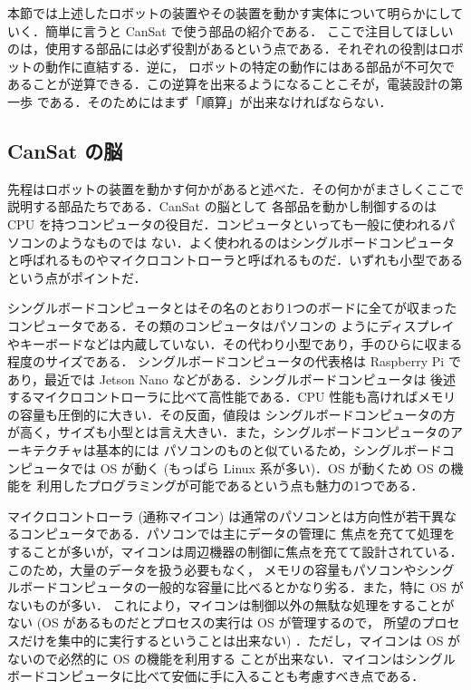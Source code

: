 \documentclass[dvipdfmx]{jsbook}
\begin{document}
  本節では上述したロボットの装置やその装置を動かす実体について明らかにしていく．簡単に言うと CanSat で使う部品の紹介である．
  ここで注目してほしいのは，使用する部品には必ず役割があるという点である．それぞれの役割はロボットの動作に直結する．逆に，
  ロボットの特定の動作にはある部品が不可欠であることが逆算できる．この逆算を出来るようになることこそが，電装設計の第一歩
  である．そのためにはまず「順算」が出来なければならない．

\subsection{CanSat の脳}
\label{subsub:CanSat の脳}

  先程はロボットの装置を動かす何かがあると述べた．その何かがまさしくここで説明する部品たちである．CanSat の脳として
  各部品を動かし制御するのは CPU を持つコンピュータの役目だ．コンピュータといっても一般に使われるパソコンのようなものでは
  ない．よく使われるのはシングルボードコンピュータと呼ばれるものやマイクロコントローラと呼ばれるものだ．いずれも小型である
  という点がポイントだ．

  シングルボードコンピュータとはその名のとおり1つのボードに全てが収まったコンピュータである．その類のコンピュータはパソコンの
  ようにディスプレイやキーボードなどは内蔵していない．その代わり小型であり，手のひらに収まる程度のサイズである．
  シングルボードコンピュータの代表格は Raspberry Pi であり，最近では Jetson Nano などがある．シングルボードコンピュータは
  後述するマイクロコントローラに比べて高性能である．CPU 性能も高ければメモリの容量も圧倒的に大きい．その反面，値段は
  シングルボードコンピュータの方が高く，サイズも小型とは言え大きい．また，シングルボードコンピュータのアーキテクチャは基本的には
  パソコンのものと似ているため，シングルボードコンピュータでは OS が動く (もっぱら Linux 系が多い)．OS が動くため OS の機能を
  利用したプログラミングが可能であるという点も魅力の1つである．

  マイクロコントローラ (通称マイコン) は通常のパソコンとは方向性が若干異なるコンピュータである．パソコンでは主にデータの管理に
  焦点を充てて処理をすることが多いが，マイコンは周辺機器の制御に焦点を充てて設計されている．このため，大量のデータを扱う必要もなく，
  メモリの容量もパソコンやシングルボードコンピュータの一般的な容量に比べるとかなり劣る．また，特に OS がないものが多い．
  これにより，マイコンは制御以外の無駄な処理をすることがない (OS があるものだとプロセスの実行は OS が管理するので，
  所望のプロセスだけを集中的に実行するということは出来ない) ．ただし，マイコンは OS がないので必然的に OS の機能を利用する
  ことが出来ない．マイコンはシングルボードコンピュータに比べて安価に手に入ることも考慮すべき点である．
\end{document}
